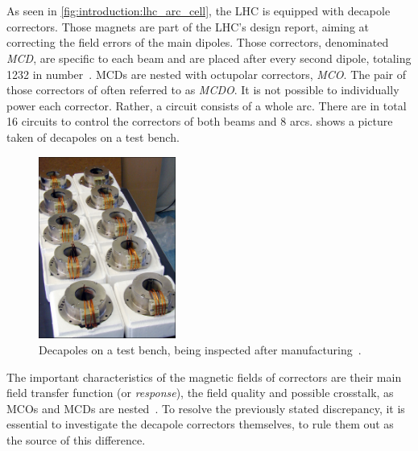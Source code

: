 \section{}
\label{section:decapoles:chromaticity}

As seen in \cref{fig:introduction:lhc_arc_cell}, the LHC is equipped with decapole correctors. Those
magnets are part of the LHC's design report, aiming at correcting the field errors of the main
dipoles. Those correctors, denominated \textit{MCD}, are specific to each beam and are placed after
every second dipole, totaling 1232 in number~\cite{venturini_delsolaro_magnetic_2005}.  MCDs are
nested with octupolar correctors, \textit{MCO}. The pair of those correctors of often referred to as
\textit{MCDO}. 
It is not possible to individually power each corrector. Rather, a circuit consists of a whole arc.
There are in total 16 circuits to control the correctors of both beams and 8 arcs.
 shows a picture taken of decapoles on a test bench.

\begin{figure}
    \centering
    \includegraphics[width=0.4\textwidth]{./images/decapoles_real_pic.jpg}
    \caption{Decapoles on a test bench, being inspected after
    manufacturing~\cite{noauthor_ten_2001}.}
    \label{fig:decapoles:decapole_picture}
\end{figure}

The important characteristics of the magnetic fields of correctors are their main field transfer
function (or \textit{response}), the field quality and possible crosstalk, as MCOs and MCDs are
nested~\cite{venturini_delsolaro_magnetic_2005}. To resolve the previously stated discrepancy, it is
essential to investigate the decapole correctors themselves, to rule them out as the source of this
difference.

